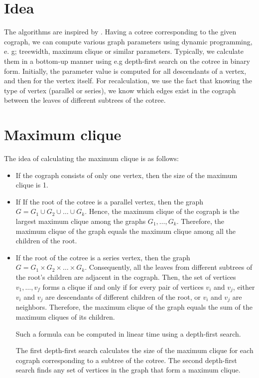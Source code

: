 \label{Properties}
\section{Idea}
The algorithms are inspired by \cite{CORNEIL1981163}.
Having a cotree corresponding to the given cograph, we can compute various graph parameters using dynamic programming, e. g; treewidth,  maximum clique or similar parameters. Typically, we calculate them in a bottom-up manner using e.g depth-first search on the cotree in binary form. Initially, the parameter value is computed for all descendants of a vertex, and then for the vertex itself. For recalculation, we use the fact that knowing the type of vertex (parallel or series), we know which edges exist in the cograph between the leaves of different subtrees of the cotree.

\section{Maximum clique}

The idea of calculating the maximum clique is as follows:
\begin{itemize}
    \item If the cograph consists of only one vertex, then the size of the maximum clique is 1.
    \item If If the root of the cotree is a parallel vertex, then the graph $G=G_1 \cup G_2 \cup \dots \cup G_k$. Hence, the maximum clique of the cograph is the largest maximum clique among the graphs $G_1 , \dots , G_k$. Therefore, the maximum clique of the graph equals the maximum clique among all the children of the root.
    \item If the root of the cotree is a series vertex, then the graph $G=G_1 \times G_2 \times \dots \times G_k$. Consequently, all the leaves from different subtrees of the root's children are adjacent in the cograph. Then, the set of vertices $v_1, \dots , v_f$ forms a clique if and only if for every pair of vertices $v_i$ and $v_j$, either $v_i$ and $v_j$ are descendants of different children of the root, or $v_i$ and $v_j$ are neighbors. Therefore, the maximum clique of the graph equals the sum of the maximum cliques of its children.

    Such a formula can be computed in linear time using a depth-first search.

    The first depth-first search calculates the size of the maximum clique for each cograph corresponding to a subtree of the cotree.
The second depth-first search finds any set of vertices in the graph that form a maximum clique.
\end{itemize}

